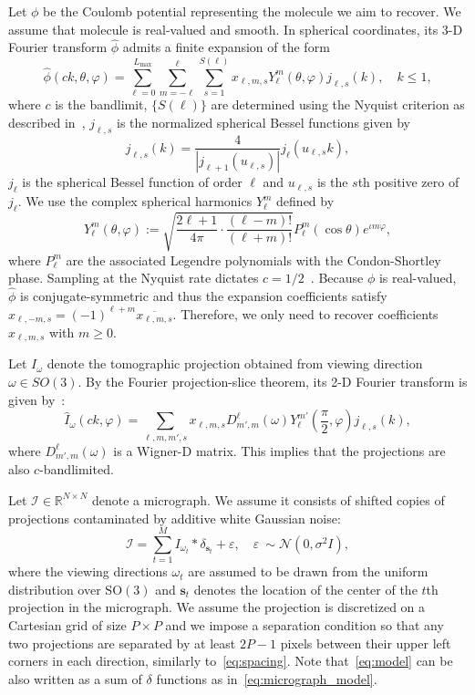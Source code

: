 \documentclass[12pt]{article}
\newcommand{\1}{\mathbf{1}}
\newcommand{\II}{\mathcal{I}}
\newcommand{\mb}{\mathbf}
\newcommand{\tamir}{x}
\newcommand{\RNN}{\mathbb{R}^{N\times N}}
\theoremstyle{plain}
\theoremstyle{definition}
\theoremstyle{remark}
\theoremstyle{plain}
\theoremstyle{remark}
\theoremstyle{plain}
\theoremstyle{plain}
\begin{document}
Let $\phi$ be the Coulomb potential representing the molecule we aim to recover. 
We assume that molecule is real-valued and smooth. In spherical coordinates, its 3-D Fourier transform $\widehat\phi$ admits a finite expansion of the form
\begin{equation} \label{eq:volume_expansion_app} 
\widehat \phi(ck, \theta, \varphi) = \sum_{\ell = 0}^{L_{\text{max}}}\sum_{m=-\ell}^{\ell}\sum_{s=1}^{S(\ell)}\tamir_{\ell, m, s}Y_{\ell}^m(\theta,\varphi)j_{\ell,s}(k), \quad k\leq 1,
\end{equation}
where $c$ is the bandlimit, $\{S(\ell)\}$ are determined using the Nyquist criterion as described in~\cite{bhamre2017anisotropic}, $j_{\ell,s}$ is the normalized spherical Bessel functions given by
\[ j_{\ell, s}(k) = \frac{4}{|j_{\ell+1}(u_{\ell, s})|}j_{\ell}(u_{\ell,s} k),\]
$j_{\ell}$ is the spherical Bessel function of order $\ell$ and  $u_{\ell,s}$ is the $s$th positive zero of $j_{\ell}$. We use 
the complex spherical harmonics $Y_{\ell}^m$ defined by  
\[ Y_{\ell}^m(\theta,\varphi) := \sqrt{\frac{2\ell+1}{4\pi}\cdot\frac{(\ell-m)!}{(\ell+m)!}}P_{\ell}^m(\cos\theta)e^{\iota m\varphi},\]
where $P_{\ell}^m$ are the associated Legendre polynomials with the Condon-Shortley phase. 
Sampling at the Nyquist rate dictates $c=1/2$~\cite{levin20173d}. 
Because $\phi$ is real-valued,  $\widehat \phi$ is conjugate-symmetric and thus the expansion coefficients satisfy $\tamir_{\ell, -m, s} = (-1)^{\ell+m}\overline{\tamir_{\ell,m,s}}$. Therefore, we only need to recover coefficients $\tamir_{\ell, m, s}$ with $m\geq 0$. 

Let $I_{\omega}$ denote the tomographic projection obtained from viewing direction $\omega\in SO(3)$. By the Fourier projection-slice theorem, its 2-D Fourier transform  is given by~\cite{natterer1986mathematics}:
\begin{equation*}\label{eq:projection_model}
\widehat I_{\omega}(ck,\varphi) = \sum_{\ell,m,m',s}\tamir_{\ell,m,s}D_{m',m}^{\ell}(\omega)Y_{\ell}^{m'}\left(\frac{\pi}{2},\varphi\right)j_{\ell,s}(k),
\end{equation*}
where $D_{m',m}^{\ell}(\omega)$ is a Wigner-D matrix. This implies that the projections are also $c$-bandlimited.

Let $\II\in\RNN$ denote a micrograph. We assume it consists of shifted copies of projections contaminated by additive white Gaussian noise:
\begin{equation}\label{eq:micrograph_model}
\II = \sum_{t=1}^{M} I_{\omega_t}\ast\delta_{\mb s_t}+ \varepsilon, \quad \varepsilon~\sim\mathcal{N}(0,\sigma^2 I),
\end{equation}
where the viewing directions $\omega_t$ are assumed to be drawn from the uniform distribution over $\text{SO}(3)$ and $\mb s_t$ denotes the location of the center of the $t$th projection in the micrograph.  
We assume the projection is discretized on a Cartesian grid  of size $P\times P$ and we impose a separation condition so that any two projections are separated by at least $2P-1$ pixels between their upper left corners  in each direction, similarly to~\eqref{eq:spacing}. Note that~\eqref{eq:model} can be also written as a sum of $\delta$ functions as in~\eqref{eq:micrograph_model}. 
\end{document}
